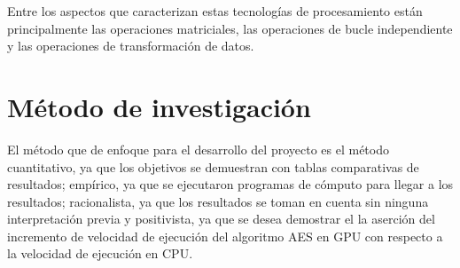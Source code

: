 \documentclass[../main.tex]{subfiles}
\begin{document}
  Entre los aspectos que caracterizan estas tecnologías de procesamiento están principalmente las operaciones matriciales, las operaciones de bucle independiente y las operaciones de transformación de datos.

  \section{Método de investigación}

  El método que de enfoque para el desarrollo del proyecto es el método cuantitativo, ya que los objetivos se demuestran con tablas comparativas de resultados; empírico, ya que se ejecutaron programas de cómputo para llegar a los resultados; racionalista, ya que los resultados se toman en cuenta sin ninguna interpretación previa y positivista, ya que se desea demostrar el la aserción del incremento de velocidad de ejecución del algoritmo AES en GPU con respecto a la velocidad de ejecución en CPU.

  \bibliografia
\end{document}

